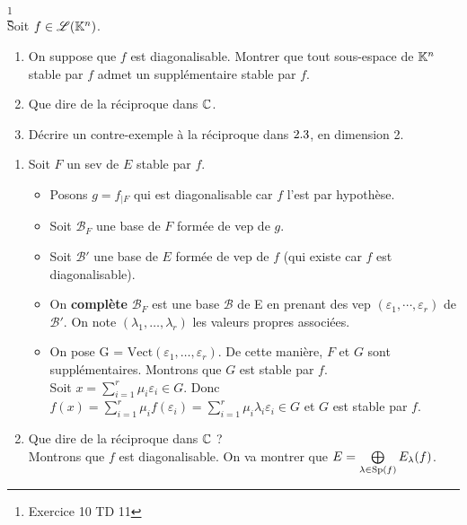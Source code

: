 \begin{exercice} \footnote{Exercice 10 TD 11} \\
    Soit $f \in \mathscr{L}(\mathbb{K}^n)$.
    \begin{enumerate}
        \item On suppose que $f$ est diagonalisable. Montrer que tout sous-espace de $\mathbb{K}^n$ stable par $f$ admet un supplémentaire stable par $f$.
        \item Que dire de la réciproque dans $\mathbb{C}$.
        \item Décrire un contre-exemple à la réciproque dans $2.3$, en dimension 2.
    \end{enumerate}
\end{exercice}  

\begin{enumerate}
    \item Soit $F$ un sev de $E$ stable par $f$.
    \begin{itemize}
        \item Posons $\boxed{g = f_{\vert F}}$ qui est diagonalisable car $f$ l'est par hypothèse. 
        \item Soit $\mathscr{B}_F$ une base de $F$ formée de vep de $g$. 
        \item Soit $\mathscr{B}'$ une base de $E$ formée de vep de $f$ (qui existe car $f$ est diagonalisable).
        \item On \textbf{complète} $\mathscr{B}_F$ est une base $\mathscr{B}$ de E en prenant des vep $(\varepsilon_1, \cdots, \varepsilon_r)$ de $\mathscr{B}'$. On note $(\lambda_1, \dots, \lambda_r)$ les valeurs propres associées. 
        \item On pose G = $\mathrm{Vect}(\varepsilon_1, \dots, \varepsilon_r)$. De cette manière, $F$ et $G$ sont supplémentaires. Montrons que $G$ est stable par $f$. \\
        Soit $x = \sum\limits_{i=1}^{r} \mu_i \varepsilon_i \in G$. Donc $f(x) = \sum\limits_{i=1}^{r} \mu_i f(\varepsilon_i) =  \sum\limits_{i=1}^{r} \mu_i \lambda_i \varepsilon_i \in G$ et $G$ est stable par $f$.
    \end{itemize}
    
    \item Que dire de la réciproque dans $\mathbb{C}$ ? \\
    Montrons que $f$ est diagonalisable. On va montrer que $E = \bigoplus\limits_{\lambda \in \mathrm{Sp}(f)} E_\lambda (f)$.
    

\end{enumerate}
